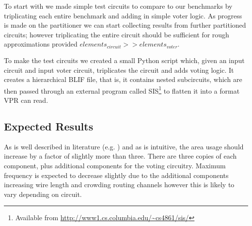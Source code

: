 \documentclass[12pt,final,oneside]{dwThesis} %
\begin{document}
To start with we made simple test circuits to compare to our benchmarks by triplicating each entire benchmark and adding in simple voter logic. As progress is made on the partitioner we can start collecting results from further partitioned circuits; however triplicating the entire circuit should be sufficient for rough approximations provided $elements_{circuit} >> elements_{voter}$.

To make the test circuits we created a small Python script which, given an input circuit and input voter circuit, triplicates the circuit and adds voting logic. It creates a hierarchical \ac{BLIF} file, that is, it contains nested subcircuits, which are then passed through an external program called \ac{SIS}\footnote{Available from \url{http://www1.cs.columbia.edu/~cs4861/sis/}} to flatten it into a format \ac{VPR} can read.

\subsection{Expected Results}
As is well described in literature (e.g. \cite{HardeningTechniques}) and as is intuitive, the area usage should increase by a factor of slightly more than three. There are three copies of each component, plus additional components for the voting circuitry. Maximum frequency is expected to decrease slightly due to the additional components increasing wire length and crowding routing channels however this is likely to vary depending on circuit.
\end{document}

